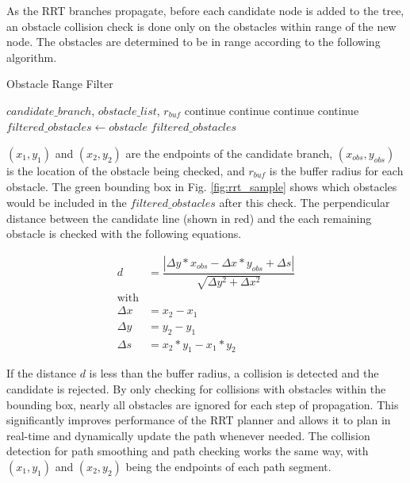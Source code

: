 \documentclass[letterpaper, 10 pt, conference]{ieeeconf}  %
\begin{document}
As the RRT branches propagate, before each candidate node is added to the tree, an obstacle collision check is done only on the obstacles within range of the new node. The obstacles are determined to be in range according to the following algorithm.

\begin{algorithm}
  \caption{Obstacle Range Filter}
  \label{dyn_path_plan}
\begin{algorithmic}
  \REQUIRE $\mathit{candidate\_branch}$, $\mathit{obstacle\_list}$, $r_{\mathit{buf}}$
      \STATE continue
      \STATE continue
      \STATE continue
      \STATE continue
    \ELSE
      \STATE $\mathit{filtered\_obstacles} \gets \mathit{obstacle}$
    \ENDIF
  \ENDFOR
  \RETURN $\mathit{filtered\_obstacles}$
\end{algorithmic}
\end{algorithm}

 $(x_1,y_1)$ and $(x_2,y_2)$ are the endpoints of the candidate branch, $(x_{\mathit{obs}},y_{\mathit{obs}})$ is the location of the obstacle being checked, and $r_{\mathit{buf}}$ is the buffer radius for each obstacle. The green bounding box in Fig. \ref{fig:rrt_sample} shows which obstacles would be included in the $\mathit{filtered\_obstacles}$ after this check. The perpendicular distance between the candidate line (shown in red) and the each remaining obstacle is checked with the following equations.

\begin{align}
  d &= \dfrac{|\Delta y*x_{\mathit{obs}} -
      \Delta x*y_{\mathit{obs}} + \Delta s|}
      {\sqrt{\Delta y^2 + \Delta x^2}}\\
  \nonumber \text{with}\\
  \Delta x &= x_2 - x_1\\
  \Delta y &= y_2 - y_1\\
  \Delta s &= x_2*y_1 -x_1*y_2
\end{align}

 If the distance $d$ is less than the buffer radius, a collision is detected and the candidate is rejected. By only checking for collisions with obstacles within the bounding box, nearly all obstacles are ignored for each step of propagation. This significantly improves performance of the RRT planner and allows it to plan in real-time and dynamically update the path whenever needed. The collision detection for path smoothing and path checking works the same way, with $(x_1,y_1)$ and $(x_2,y_2)$ being the endpoints of each path segment.
\end{document}
